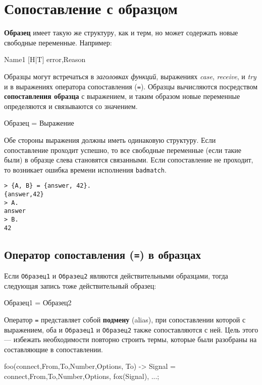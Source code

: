 \section{Сопоставление с образцом}

\textbf{Образец} имеет такую же структуру, как и терм, но может содержать новые
свободные переменные. Например:

\begin{erlang}
Name1
[H|T]
{error,Reason}
\end{erlang}

Образцы могут встречаться в \textit{заголовках функций}, выражениях 
\textit{case}, \textit{receive}, и \textit{try} и в выражениях оператора
сопоставления (\texttt{=}). Образцы вычисляются посредством 
\textbf{сопоставления образца} с выражением, и таким образом новые переменные
определяются и связываются со значением.

\begin{erlangru}
Образец = Выражение
\end{erlangru}

Обе стороны выражения должны иметь одинаковую структуру. Если сопоставление 
проходит успешно, то все свободные переменные (если такие были) в образце слева
становятся связанными. Если сопоставление не проходит, то возникает ошибка
времени исполнения \texttt{badmatch}.


\begin{verbatim}
> {A, B} = {answer, 42}.
{answer,42}
> A.
answer
> B.
42
\end{verbatim}


\subsection{Оператор сопоставления (\texttt{=}) в образцах}

Если \texttt{Образец1} и \texttt{Образец2} являются действительными образцами, тогда следующая запись тоже действительный образец:

\begin{erlangru}
Образец1 = Образец2
\end{erlangru}

Оператор \texttt{=} представляет собой \textbf{подмену} (alias), при
сопоставлении которой с выражением, оба и \texttt{Образец1} и \texttt{Образец2}
также сопоставляются с ней. Цель этого --- избежать необходимости повторно
строить термы, которые были разобраны на составляющие в сопоставлении.

\begin{erlang}
foo({connect,From,To,Number,Options}, To) ->
    Signal = {connect,From,To,Number,Options},
    fox(Signal),
    ...;
\end{erlang}

